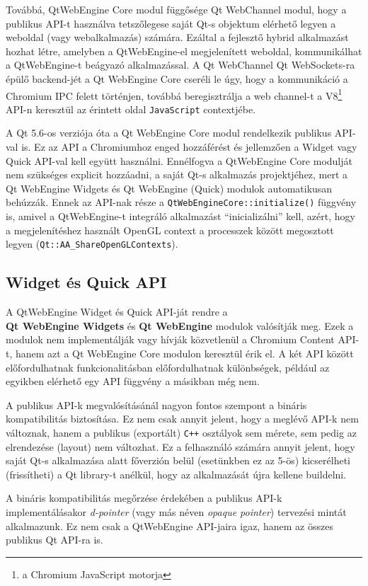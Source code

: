 \documentclass[12pt]{report}
\begin{document}
Továbbá, QtWebEngine Core modul függősége Qt WebChannel modul, hogy a publikus API-t
használva tetszőlegese saját Qt-s objektum elérhető legyen a weboldal (vagy webalkalmazás)
számára. Ezáltal a fejlesztő hybrid alkalmazást hozhat létre, amelyben a QtWebEngine-el
megjelenített weboldal, kommunikálhat a QtWebEngine-t beágyazó alkalmazással.
A Qt WebChannel Qt WebSockets-ra épülő backend-jét a Qt WebEngine Core cseréli le úgy,
hogy a kommunikáció a Chromium IPC felett történjen, továbbá beregisztrálja a web channel-t
a V8\footnote{a Chromium JavaScript motorja} API-n keresztül az érintett oldal
\texttt{JavaScript} contextjébe.

A Qt 5.6-os verziója óta a Qt WebEngine Core modul rendelkezik publikus API-val is.
Ez az API a Chromiumhoz enged hozzáférést és jellemzően a Widget vagy Quick API-val kell
együtt használni. Ennélfogva a QtWebEngine Core modulját nem szükséges explicit hozzáadni,
a saját Qt-s alkalmazás projektjéhez, mert a Qt WebEngine Widgets és Qt WebEngine (Quick)
modulok automatikusan behúzzák. Ennek az API-nak része a
\texttt{QtWebEngineCore::initialize()} függvény is, amivel a QtWebEngine-t integráló
alkalmazást ``inicializálni'' kell, azért, hogy a megjelenítéshez használt OpenGL context
a processzek között megosztott legyen (\texttt{Qt::AA\_ShareOpenGLContexts}).

\subsection{Widget és Quick API}
A QtWebEngine Widget és Quick API-ját rendre a \\
\textbf{Qt WebEngine Widgets} és \textbf{Qt WebEngine} modulok valósítják meg.
Ezek a modulok nem implementálják vagy hívják közvetlenül a Chromium Content API-t,
hanem azt a Qt WebEngine Core modulon keresztül érik el. A két API között előfordulhatnak
funkcionalitásban előfordulhatnak különbségek, például az egyikben elérhető egy API
függvény a másikban még nem.

A publikus API-k megvalósításánál nagyon fontos szempont a bináris kompatibilitás
biztosítása. Ez nem csak annyit jelent, hogy a meglévő API-k nem változnak, hanem a publikus
(exportált) \texttt{C++} osztályok sem mérete, sem pedig az elrendezése (layout) nem
változhat. Ez a felhasználó számára annyit jelent, hogy saját Qt-s alkalmazása alatt
főverzión belül (esetünkben ez az 5-ös) kicserélheti (frissítheti) a Qt library-t anélkül,
hogy az alkalmazását újra kellene buildelni.

A bináris kompatibilitás megőrzése érdekében a publikus API-k implementálásakor
\textit{d-pointer} (vagy más néven \textit{opaque pointer}) tervezési mintát alkalmazunk.
Ez nem csak a QtWebEngine API-jaira igaz, hanem az összes publikus Qt API-ra is.
\end{document}
